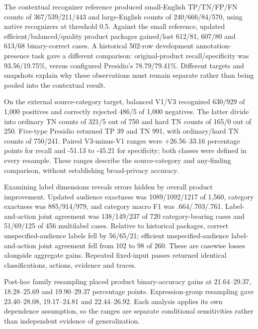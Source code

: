 \documentclass[conference]{IEEEtran}
\begin{document}
The contextual recognizer reference produced small-English TP/TN/FP/FN counts of 367/539/211/443 and large-English counts of 240/666/84/570, using native recognizers at threshold 0.5. Against the small reference, updated efficient/balanced/quality product packages gained/lost 612/81, 607/80 and 613/68 binary-correct cases. A historical 502-row development annotation-presence task gave a different comparison: original-product recall/specificity was 93.56/19.75\%, versus configured Presidio's 78.79/79.41\%. Different targets and snapshots explain why these observations must remain separate rather than being pooled into the contextual result.

On the external source-category target, balanced V1/V3 recognized 630/929 of 1,000 positives and correctly rejected 486/5 of 1,000 negatives. The latter divide into ordinary TN counts of 321/5 out of 750 and hard TN counts of 165/0 out of 250. Five-type Presidio returned TP 39 and TN 991, with ordinary/hard TN counts of 750/241. Paired V3-minus-V1 ranges were +26.56--33.16 percentage points for recall and -51.13 to -45.21 for specificity; both classes were defined in every resample. These ranges describe the source-category and any-finding comparison, without establishing broad-privacy accuracy.

Examining label dimensions reveals errors hidden by overall product improvement. Updated audience exactness was 1089/1092/1217 of 1,560, category exactness was 885/914/979, and category macro F1 was .664/.703/.761. Label-and-action joint agreement was 138/149/237 of 720 category-bearing cases and 51/69/125 of 456 multilabel cases. Relative to historical packages, correct unspecified-audience labels fell by 56/65/21; efficient unspecified-audience label-and-action joint agreement fell from 102 to 98 of 260. These are casewise losses alongside aggregate gains. Repeated fixed-input passes returned identical classifications, actions, evidence and traces.

Post-hoc family resampling placed product binary-accuracy gains at 21.64--29.37, 18.28--25.69 and 19.90--29.37 percentage points. Expression-group resampling gave 23.40--28.08, 19.17--24.81 and 22.44--26.92. Each analysis applies its own dependence assumption, so the ranges are separate conditional sensitivities rather than independent evidence of generalization.
\end{document}
